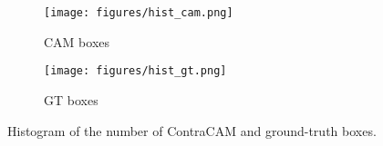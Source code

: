 \begin{figure}[h]
\centering\small
\begin{subfigure}{0.32\textwidth}
\texttt{[image: figures/hist\_cam.png]}
\caption{CAM boxes}
\end{subfigure}
\begin{subfigure}{0.32\textwidth}
\texttt{[image: figures/hist\_gt.png]}
\caption{GT boxes}
\end{subfigure}
\caption{
Histogram of the number of ContraCAM and ground-truth boxes.
}\label{fig:hard-hist}
\end{figure}

